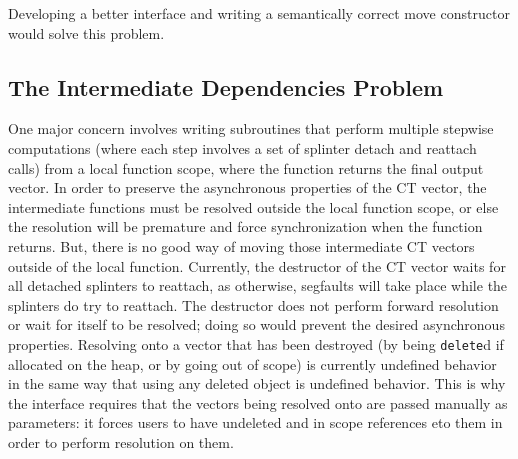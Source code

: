 Developing a better interface and writing a semantically correct move
constructor would solve this problem.

\subsection{The Intermediate Dependencies Problem}
One major concern involves
writing subroutines that perform multiple stepwise computations (where each step
involves a set of splinter detach and reattach calls) from a local function
scope, where the function returns the final output vector. In order to preserve
the asynchronous properties of the CT vector, the intermediate functions must
be resolved outside the local function scope, or else the resolution will be
premature and force synchronization when the function returns. But, there is no
good way of moving those intermediate CT vectors outside of the local function.
Currently, the destructor of the CT vector waits for all detached splinters to
reattach, as otherwise, segfaults will take place while the splinters do try to
reattach. The destructor does not perform forward resolution or wait for itself
to be resolved; doing so would prevent the desired asynchronous properties.
Resolving onto a vector that has been destroyed (by being \texttt{delete}d if
allocated on the heap, or by going out of scope) is currently undefined behavior
in the same way that using any deleted object is undefined behavior. This is why
the interface requires that the vectors being resolved onto are passed manually
as parameters: it forces users to have undeleted and in scope references eto
them in order to perform resolution on them.
